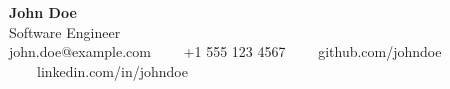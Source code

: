 \begin{center}
    {\Huge \textbf{John Doe}} \\
    \vspace{4pt}
    Software Engineer \\
    \vspace{4pt}
    john.doe@example.com \ \ \textbullet \ \ +1 555 123 4567 \ \ \textbullet \ \ github.com/johndoe \ \ \textbullet \ \ linkedin.com/in/johndoe
\end{center}
